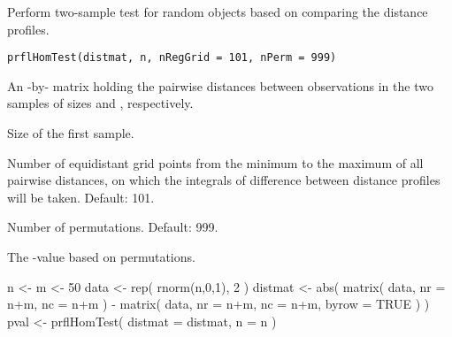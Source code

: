 \documentclass[a4paper]{book}
\begin{document}
%
\begin{Description}\relax
Perform two-sample test for random objects based on comparing the distance profiles.
\end{Description}
%
\begin{Usage}
\begin{verbatim}
prflHomTest(distmat, n, nRegGrid = 101, nPerm = 999)
\end{verbatim}
\end{Usage}
%
\begin{Arguments}
\begin{ldescription}
\item[\code{distmat}] An -by- matrix holding the pairwise distances between observations 
in the two samples of sizes  and , respectively.

\item[\code{n}] Size of the first sample.

\item[\code{nRegGrid}] Number of equidistant grid points from the minimum to the maximum of all pairwise distances,
on which the integrals of difference between distance profiles will be taken. Default: 101.

\item[\code{nPerm}] Number of permutations. Default: 999.
\end{ldescription}
\end{Arguments}
%
\begin{Value}
The -value based on permutations.
\end{Value}
%
\begin{Examples}
\begin{ExampleCode}
n <- m <- 50
data <- rep( rnorm(n,0,1), 2 )
distmat <- abs( matrix( data, nr = n+m, nc = n+m ) - matrix( data, nr = n+m, nc = n+m, byrow = TRUE ) )
pval <- prflHomTest( distmat = distmat, n = n )
\end{ExampleCode}
\end{Examples}
\printindex{}
\end{document}
